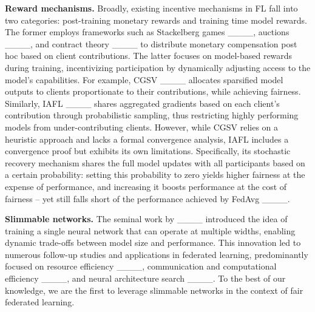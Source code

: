 \textbf{Reward mechanisms.} Broadly, existing incentive mechanisms in FL fall into two categories: post-training monetary rewards and training time model rewards. The former employs frameworks such as Stackelberg games ____, auctions ____, and contract theory ____ to distribute monetary compensation post hoc based on client contributions. The latter focuses on model-based rewards during training, incentivizing participation by dynamically adjusting access to the model’s capabilities. For example, CGSV ____ allocates sparsified model outputs to clients proportionate to their contributions, while achieving fairness. Similarly, IAFL ____ shares aggregated gradients based on each client's contribution through probabilistic sampling, thus restricting highly performing models from under-contributing clients. However, while CGSV relies on a heuristic approach and lacks a formal convergence analysis, IAFL includes a convergence proof but exhibits its own limitations. Specifically, its stochastic recovery mechanism shares the full model updates with all participants based on a certain probability: setting this probability to zero yields higher fairness at the expense of performance, and increasing it boosts performance at the cost of fairness -- yet still falls short of the performance achieved by FedAvg ____. 

\textbf{Slimmable networks.} The seminal work by ____ introduced the idea of training a single neural network that can operate at multiple widths, enabling dynamic trade-offs between model size and performance. This innovation led to numerous follow-up studies and applications in federated learning, predominantly focused on resource efficiency ____, communication and computational efficiency ____, and neural architecture search ____. To the best of our knowledge, we are the first to leverage slimmable networks in the context of fair federated learning.
